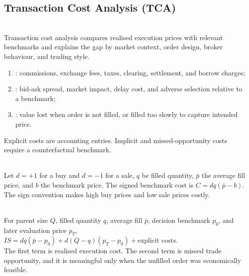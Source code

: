 \subsection{Transaction Cost Analysis (TCA)}

\begin{definition} \\
Transaction cost analysis compares realised execution prices with relevant benchmarks and explains the gap by market context, order design, broker behaviour, and trading style.
\end{definition}

\begin{taxonomy} 
\begin{enumerate}[label=\roman*.]
\setlength{\itemsep}{0pt}
\item {}: commissions, exchange fees, taxes, clearing, settlement, and borrow charges;
\item {}: bid-ask spread, market impact, delay cost, and adverse selection relative to a benchmark;
\item {}: value lost when order is not filled, or filled too slowly to capture intended price.
\end{enumerate}
Explicit costs are accounting entries. Implicit and missed-opportunity costs require a counterfactual benchmark.
\end{taxonomy}

\begin{model} \\
Let $d=+1$ for a buy and $d=-1$ for a sale, $q$ be filled quantity, $\bar{p}$ the average fill price, and $b$ the benchmark price. The signed benchmark cost is $C=dq(\bar{p}-b)$.\\
The sign convention makes high buy prices and low sale prices costly.
\end{model}

\begin{model} \\
For parent size $Q$, filled quantity $q$, average fill $\bar{p}$, decision benchmark $p_0$, and later evaluation price  $p_T$,\\
$IS=dq(\bar{p}-p_0)+d(Q-q)(p_T-p_0)+\text{explicit costs}$.\\
The first term is realised execution cost. The second term is missed trade opportunity, and it is meaningful only when the unfilled order was economically feasible.
\end{model}

